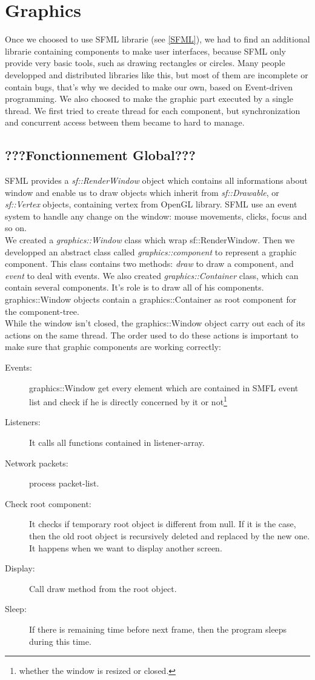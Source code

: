 \documentclass{scrreprt}
\begin{document}
		\chapter{Graphics}
		Once we choosed to use SFML librarie (see \ref{SFML}), we had to find an additional librarie containing components to make user interfaces, because SFML only provide very basic tools, such as drawing rectangles or circles. Many people developped and distributed libraries like this, but most of them are incomplete or contain bugs, that's why we decided to make our own, based on Event-driven programming. We also choosed to make the graphic part executed by a single thread. We first tried to create thread for each component, but synchronization and concurrent access between them became to hard to manage.

		\section{???Fonctionnement Global???} %
		SFML provides a \emph{sf::RenderWindow} object which contains all informations about window and enable us to draw objects which inherit from \emph{sf::Drawable}, or \emph{sf::Vertex} objects, containing vertex from OpenGL library. SFML use an event system to handle any change on the window: mouse movements, clicks, focus and so on.\\

		We created a \emph{graphics::Window} class which wrap sf::RenderWindow. Then we developped an abstract class called \emph{graphics::component} to represent a graphic component. This class contains two methods: \emph{draw} to draw a component, and \emph{event} to deal with events.
		We also created \emph{graphics::Container} class, which can contain several components. It's role is to draw all of his components. graphics::Window objects contain a graphics::Container as root component for the component-tree.\\

		While the window isn't closed, the graphics::Window object carry out each of its actions on the same thread. The order used to do these actions is important to make sure that graphic components are working correctly:
		\begin{description}
		\item[Events:]{graphics::Window get every element which are contained in SMFL event list and check if he is directly concerned by it or not\footnote{whether the window is resized or closed.}}
		\item[Listeners:]{It calls all functions contained in listener-array.}
		\item[Network packets:]{process packet-list.}
		\item[Check root component:] It checks if temporary root object is different from null. If it is the case, then the old root object is recursively deleted and replaced by the new one. It happens when we want to display another screen.
		\item[Display:]{Call draw method from the root object.}
		\item[Sleep:]{If there is remaining time before next frame, then the program sleeps during this time.}
		\end{description}
\end{document}
